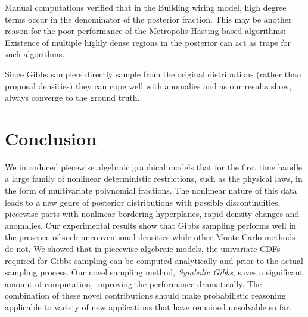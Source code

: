 \documentclass[]{article}
\begin{document}
Manual computations verified that in the Building wiring model, 
high degree terms occur in the denominator of the posterior fraction. 
This may be another reason for the poor performance of the Metropolis-Hasting-based algorithms: Existence of multiple highly dense regions in the posterior can act as traps for such algorithms.

Since Gibbs samplers directly sample from the original distributions (rather than proposal densities) they can cope well with anomalies and as our results show, always converge to the ground truth. 


 \section{Conclusion}
\label{sect:conclusion}

We introduced piecewise algebraic graphical models that for the first time handle a large family of nonlinear deterministic restrictions, such as the physical laws, in the form of multivariate polynomial fractions. The nonlinear nature of this data leads to a new genre of posterior distributions with possible discontinuities, 
piecewise parts with nonlinear bordering hyperplanes, rapid density changes and anomalies. Our experimental results show that Gibbs sampling performs well in the presence of such unconventional densities while other Monte Carlo methods do not. We showed that in piecewise algebraic models, the univariate CDFs required for Gibbs sampling can be computed analytically and prior to the actual sampling process. Our novel sampling method, \emph{Symbolic Gibbs}, saves a significant amount of computation, improving the performance dramatically. The combination of these novel contributions should make probabilistic reasoning applicable to variety of new applications that have remained unsolvable so far.      



\end{document}
